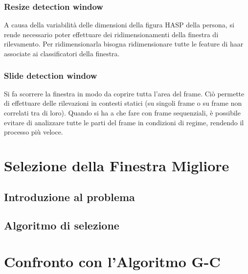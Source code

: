             \subsubsection{Resize detection window}
                A causa della variabilità delle dimensioni della figura HASP della persona, si rende necessario poter effettuare dei ridimensionamenti della finestra di rilevamento. 
                Per ridimensionarla bisogna ridimensionare tutte le feature di haar associate ai classificatori della finestra.
            \subsubsection{Slide detection window}
                Si fa scorrere la finestra in modo da coprire tutta l'area del frame.
                Ciò permette di effettuare delle rilevazioni in contesti statici (su singoli frame o su frame non correlati tra di loro).
                Quando si ha a che fare con frame sequenziali, è possibile evitare di analizzare tutte le parti del frame in condizioni di regime, rendendo il processo più veloce.
    \section{Selezione della Finestra Migliore} %
    \label{sec:best_detection_window}
        \subsection{Introduzione al problema}
        \subsection{Algoritmo di selezione}
    \section{Confronto con l'Algoritmo G-C} %
    \label{sec:gc_algorithm_comparison}